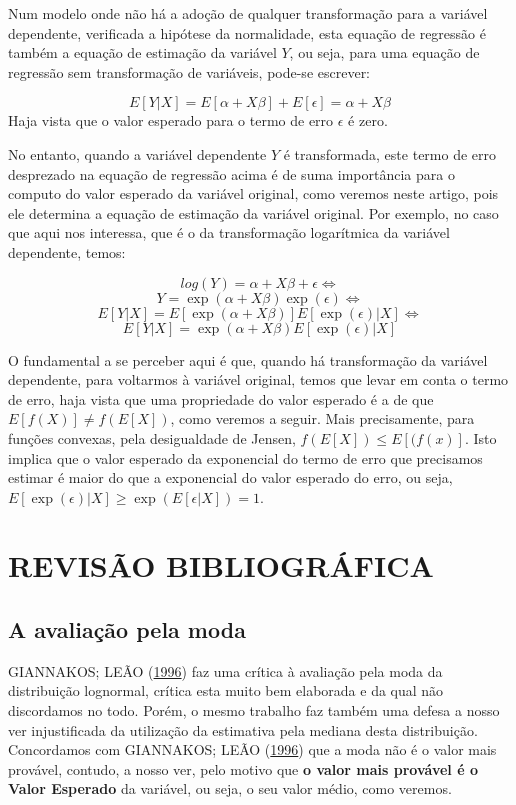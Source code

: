 \documentclass[a4paper]{article}
\begin{document}
Num modelo onde não há a adoção de qualquer transformação para a
variável dependente, verificada a hipótese da normalidade, esta equação
de regressão é também a equação de estimação da variável \(Y\), ou seja,
para uma equação de regressão sem transformação de variáveis, pode-se
escrever:

\[E[Y|X] = E[\alpha + X\beta] + E[\epsilon] = \alpha + X\beta\] Haja
vista que o valor esperado para o termo de erro \(\epsilon\) é zero.

No entanto, quando a variável dependente \(Y\) é transformada, este
termo de erro desprezado na equação de regressão acima é de suma
importância para o computo do valor esperado da variável original, como
veremos neste artigo, pois ele determina a equação de estimação da
variável original. Por exemplo, no caso que aqui nos interessa, que é o
da transformação logarítmica da variável dependente, temos:

\[log(Y) = \alpha + X\beta + \epsilon \Leftrightarrow\]
\[Y = \exp(\alpha + X\beta)\exp(\epsilon) \Leftrightarrow\]
\[E[Y|X] = E[\exp(\alpha + X\beta)]E[\exp(\epsilon)|X] \Leftrightarrow\]
\[E[Y|X] = \exp(\alpha + X\beta)E[\exp(\epsilon)|X]\]

O fundamental a se perceber aqui é que, quando há transformação da
variável dependente, para voltarmos à variável original, temos que levar
em conta o termo de erro, haja vista que uma propriedade do valor
esperado é a de que \(E[f(X)] \ne f(E[X])\), como veremos a seguir. Mais
precisamente, para funções convexas, pela desigualdade de Jensen,
\(f(E[X]) \leq E[(f(x)]\). Isto implica que o valor esperado da
exponencial do termo de erro que precisamos estimar é maior do que a
exponencial do valor esperado do erro, ou seja,
\(E[\exp(\epsilon)|X] \geq \exp(E[\epsilon|X]) = 1\).

\section{REVISÃO BIBLIOGRÁFICA}\label{revisao-bibliografica}

\subsection{A avaliação pela moda}\label{a-avaliacao-pela-moda}

GIANNAKOS; LEÃO (\protect\hyperlink{ref-giannakos}{1996}) faz uma
crítica à avaliação pela moda da distribuição lognormal, crítica esta
muito bem elaborada e da qual não discordamos no todo. Porém, o mesmo
trabalho faz também uma defesa a nosso ver injustificada da utilização
da estimativa pela mediana desta distribuição. Concordamos com
GIANNAKOS; LEÃO (\protect\hyperlink{ref-giannakos}{1996}) que a moda não
é o valor mais provável, contudo, a nosso ver, pelo motivo que \textbf{o
valor mais provável é o Valor Esperado} da variável, ou seja, o seu
valor médio, como veremos.
\end{document}
